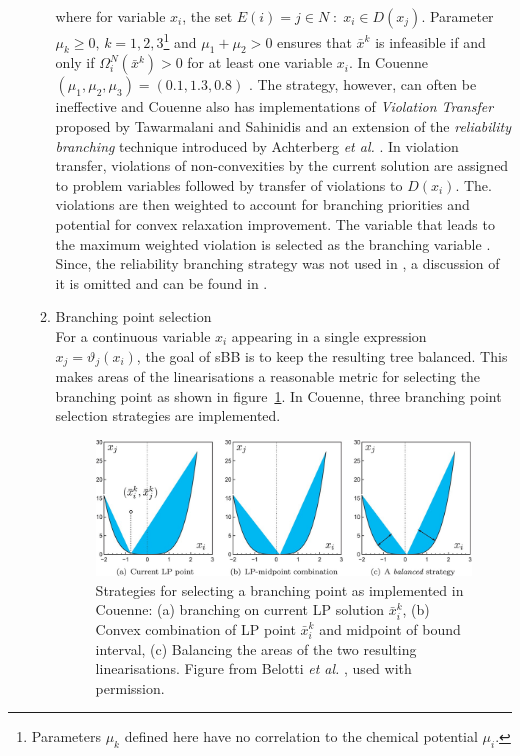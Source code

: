 \begin{enumerate}
\begin{enumerate}
				where for variable ${x}_i$, the set $E(i) = {j \in N \; : \; x_i \in D(x_j)}$. Parameter $\mu_k \geq 0, \, k = 1, 2, 3 $\footnote{Parameters $\mu_k$ defined here have no correlation to the chemical potential $\mu_i$.} and $\mu_1 + \mu_2 > 0$ ensures that $\bar{x}^k$ is infeasible if and only if $\Omega_i^N(\bar{x}^k) > 0$ for at least one variable $x_i$. In Couenne $(\mu_1, \mu_2, \mu_3) = (0.1, 1.3, 0.8)$ \cite{Belotti:2009aa}. The strategy, however, can often be ineffective and Couenne also has implementations of \emph{Violation Transfer} proposed by Tawarmalani and Sahinidis \cite{Tawarmalani:2004aa} and an extension of the \emph{reliability branching} technique introduced by Achterberg \textit{et al.} \cite{Achterberg:2005aa}. In violation transfer, violations of non-convexities by the current solution are assigned to problem variables followed by transfer of violations to $D(x_i)$.  The. violations are then weighted to account for branching priorities and potential for convex relaxation improvement. The variable that leads to the maximum weighted violation is selected as the branching variable \cite{Tawarmalani:2004aa}. Since, the reliability branching strategy was not used in {\GEM}, a discussion of it is omitted and can be found in \cite{Belotti:2022aa}.
			\item Branching point selection\\
				For a continuous variable $x_i$ appearing in a single expression $x_j = \vartheta_j(x_i)$, the goal of sBB is to keep the resulting tree balanced. This makes areas of the linearisations a reasonable metric for selecting the branching point as shown in figure~\ref{fig:branching_pt}. In Couenne, three branching point selection strategies are implemented.
				\begin{figure}[htbp]
					\centering
					\includegraphics[width=\textwidth]{figures/chapter-6/branching_point}
					\caption[Strategies for selecting a branching point]{Strategies for selecting a branching point as implemented in Couenne: (a) branching on current LP solution $\bar{x}_i^k$, (b) Convex combination of LP point $\bar{x}_i^k$ and midpoint of bound interval, (c) Balancing the areas of the two resulting linearisations. Figure from Belotti \textit{et al.} \cite{Belotti:2009aa}, used with permission.}
			\label{fig:branching_pt}
			\end{figure}
		

\end{enumerate}
\end{enumerate}
